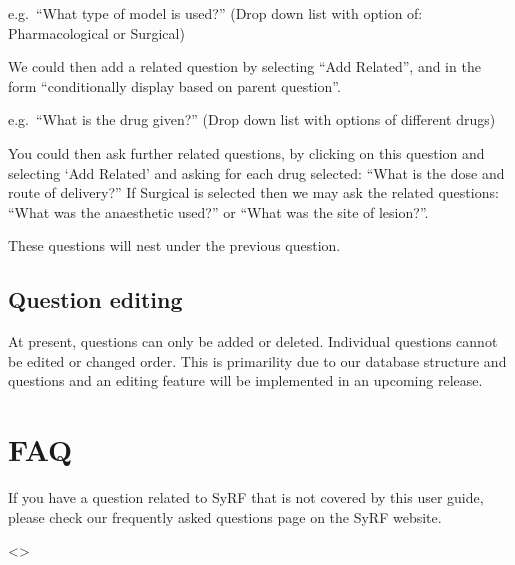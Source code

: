 \documentclass[
]{book}
\begin{document}
e.g.~``What type of model is used?''
(Drop down list with option of: Pharmacological or Surgical)

We could then add a related question by selecting ``Add Related'', and in the form ``conditionally display based on parent question''.

e.g.~``What is the drug given?''
(Drop down list with options of different drugs)

You could then ask further related questions, by clicking on this question and selecting `Add Related' and asking for each drug selected: ``What is the dose and route of delivery?'' If Surgical is selected then we may ask the related questions: ``What was the anaesthetic used?'' or ``What was the site of lesion?''.

These questions will nest under the previous question.

\hypertarget{question-editing}{%
\section{Question editing}\label{question-editing}}

At present, questions can only be added or deleted. Individual questions cannot be edited or changed order. This is primarility due to our database structure and questions and an editing feature will be implemented in an upcoming release.

\hypertarget{faq}{%
\chapter{FAQ}\label{faq}}

If you have a question related to SyRF that is not covered by this user guide, please check our frequently asked questions page on the SyRF website.

\textless{}\textgreater{}

  
\end{document}
